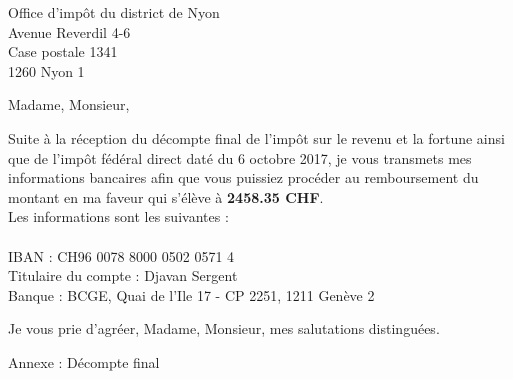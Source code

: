 \documentclass[12pt]{lettre}
\begin{document}
	
	\begin{letter}{Office d'impôt du district de Nyon \\ Avenue Reverdil 4-6 \\ Case postale 1341 \\ 1260 Nyon 1}
		\address{Djavan Sergent \\ Rue de la Terrassière 3 \\ 1207 Genève \\ No Contribuable : 114.233.98}
		\nofax
		
		\def\concname{Objet :~} %
		\opening{Madame, Monsieur,}
		Suite à la réception du décompte final de l'impôt sur le revenu et la fortune ainsi que de l'impôt fédéral direct daté du 6 octobre 2017, je vous transmets mes informations bancaires afin que vous puissiez procéder au remboursement du montant en ma faveur qui s'élève à \textbf{2458.35 CHF}.\\
		Les informations sont les suivantes :\\
		\\
		IBAN : CH96 0078 8000 0502 0571 4\\
		Titulaire du compte : Djavan Sergent\\
		Banque : BCGE, Quai de l'Ile 17 - CP 2251, 1211 Genève 2
		
		
		\closing{Je vous prie d'agréer,
			Madame, Monsieur,
			mes salutations distinguées.}
		Annexe : Décompte final
		
	\end{letter}
	
\end{document}
